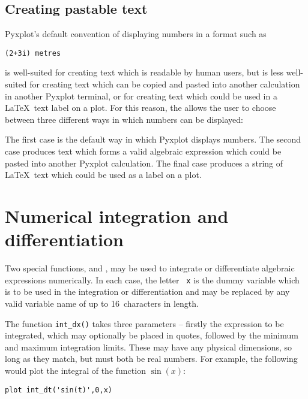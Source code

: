\subsection{Creating pastable text}
\label{sec:pastable}

Pyxplot's default convention of displaying numbers in a format such as

\begin{verbatim}
(2+3i) metres
\end{verbatim}

\noindent is well-suited for creating text which is readable by human users, but
is less well-suited for creating text which can be copied and pasted into
another calculation in another Pyxplot terminal, or for creating text which
could be used in a \LaTeX\ text label on a plot. For this reason, the
 allows the user to choose between three
different ways in which numbers can be displayed:

\vspace{3mm}

\vspace{3mm}

The first case is the default way in which Pyxplot displays numbers. The second
case produces text which forms a valid algebraic expression which could be
pasted into another Pyxplot calculation. The final case produces a string of
\LaTeX\ text which could be used as a label on a plot.

\section{Numerical integration and differentiation}

 Two special functions,
 and , may be used to integrate or
differentiate algebraic expressions numerically.  In each case, the letter {\tt
x} is the dummy variable which is to be used in the integration or
differentiation and may be replaced by any valid variable name of up to
16~characters in length.

The function {\tt int\_dx()} takes three parameters -- firstly the expression
to be integrated, which may optionally be placed in quotes, followed by the
minimum and maximum integration limits. These may have any physical dimensions,
so long as they match, but must both be real numbers. For example, the
following would plot the integral of the function $\sin(x)$:

\begin{verbatim}
plot int_dt('sin(t)',0,x)
\end{verbatim}

